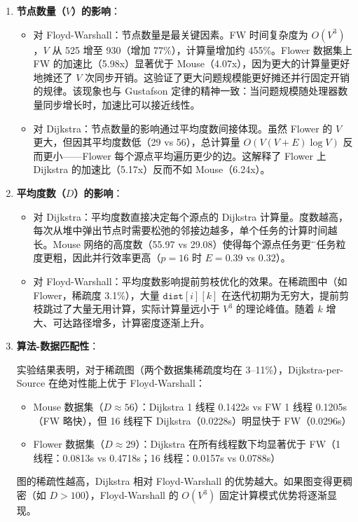 \documentclass{SYSUReport}
\begin{document}
\begin{enumerate}
    \item \textbf{节点数量（$V$）的影响}：

    \begin{itemize}
        \item 对 Floyd-Warshall：节点数量是最关键因素。FW 时间复杂度为 $O(V^3)$，$V$ 从 525 增至 930（增加 77\%），计算量增加约 455\%。Flower 数据集上 FW 的加速比（5.98x）显著优于 Mouse（4.07x），因为更大的计算量更好地摊还了 $V$ 次同步开销。这验证了更大问题规模能更好摊还并行固定开销的规律。该现象也与 Gustafson 定律的精神一致：当问题规模随处理器数量同步增长时，加速比可以接近线性。
        \item 对 Dijkstra：节点数量的影响通过平均度数间接体现。虽然 Flower 的 $V$ 更大，但因其平均度数低（29 vs 56），总计算量 $O(V(V+E)\log V)$ 反而更小——Flower 每个源点平均遍历更少的边。这解释了 Flower 上 Dijkstra 的加速比（5.17x）反而不如 Mouse（6.24x）。
    \end{itemize}

    \item \textbf{平均度数（$D$）的影响}：

    \begin{itemize}
        \item 对 Dijkstra：平均度数直接决定每个源点的 Dijkstra 计算量。度数越高，每次从堆中弹出节点时需要松弛的邻接边越多，单个任务的计算时间越长。Mouse 网络的高度数（55.97 vs 29.08）使得每个源点任务更\"重\"，任务粒度更粗，因此并行效率更高（$p=16$ 时 $E=0.39$ vs $0.32$）。
        \item 对 Floyd-Warshall：平均度数影响提前剪枝优化的效果。在稀疏图中（如 Flower，稀疏度 3.1\%），大量 $\texttt{dist}[i][k]$ 在迭代初期为无穷大，提前剪枝跳过了大量无用计算，实际计算量远小于 $V^3$ 的理论峰值。随着 $k$ 增大、可达路径增多，计算密度逐渐上升。
    \end{itemize}

    \item \textbf{算法-数据匹配性}：

    实验结果表明，对于稀疏图（两个数据集稀疏度均在 3--11\%），Dijkstra-per-Source 在绝对性能上优于 Floyd-Warshall：
    \begin{itemize}
        \item Mouse 数据集（$D \approx 56$）：Dijkstra 1 线程 0.1422s vs FW 1 线程 0.1205s（FW 略快），但 16 线程下 Dijkstra（0.0228s）明显快于 FW（0.0296s）
        \item Flower 数据集（$D \approx 29$）：Dijkstra 在所有线程数下均显著优于 FW（1 线程：0.0813s vs 0.4718s；16 线程：0.0157s vs 0.0788s）
    \end{itemize}
    图的稀疏性越高，Dijkstra 相对 Floyd-Warshall 的优势越大。如果图变得更稠密（如 $D > 100$），Floyd-Warshall 的 $O(V^3)$ 固定计算模式优势将逐渐显现。
\end{enumerate}
\end{document}
